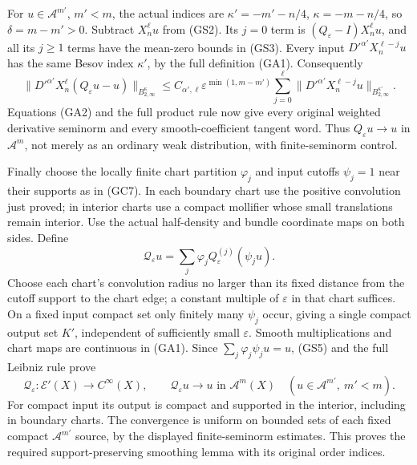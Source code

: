 \documentclass[
  11pt,
]{article}
\makeatletter
\let\ReaderOriginalAnchorStart\hyper@anchorstart
\let\ReaderOriginalAnchorEnd\hyper@anchorend
\let\ReaderPendingAliases\@empty
\def\ReaderArmAliases#1{\gdef\ReaderPendingAliases{#1}}
\def\hyper@anchorstart#1{\ReaderIfNativeAnchorTF{#1}{\ReaderPendingAliases\global\let\ReaderPendingAliases\@empty}{}\ReaderOriginalAnchorStart{#1}}
\makeatother
\begin{document}
For \(u\in\mathcal A^{m'}\), \(m'<m\), the actual indices are
\(\kappa'=-m'-n/4\), \(\kappa=-m-n/4\), so \(\delta=m-m'>0\). Subtract
\(X_n^\ell u\) from (GS2). Its \(j=0\) term is
\((Q_\varepsilon-I)X_n^\ell u\), and all its \(j\ge1\) terms have the
mean-zero bounds in (GS3). Every input \(D'^{\alpha'}X_n^{\ell-j}u\) has
the same Besov index \(\kappa'\), by the full definition (GA1).
Consequently \[
 \|D'^{\alpha'}X_n^\ell(Q_\varepsilon u-u)\|_{B^\kappa_{2,\infty}}
 \le C_{\alpha',\ell}\varepsilon^{\min(1,m-m')}
       \sum_{j=0}^\ell
       \|D'^{\alpha'}X_n^{\ell-j}u\|_{B^{\kappa'}_{2,\infty}}.
 \tag{GS5}
\] Equations (GA2) and the full product rule now give every original
weighted derivative seminorm and every smooth-coefficient tangent word.
Thus \(Q_\varepsilon u\to u\) in \(\mathcal A^m\), not merely as an
ordinary weak distribution, with finite-seminorm control.

Finally choose the locally finite chart partition \(\varphi_j\) and
input cutoffs \(\psi_j=1\) near their supports as in (GC7). In each
boundary chart use the positive convolution just proved; in interior
charts use a compact mollifier whose small translations remain interior.
Use the actual half-density and bundle coordinate maps on both sides.
Define \[
 \mathcal Q_\varepsilon u
    =\sum_j\varphi_j Q^{(j)}_\varepsilon(\psi_j u).
 \tag{GS6}
\] Choose each chart's convolution radius no larger than its fixed
distance from the cutoff support to the chart edge; a constant multiple
of \(\varepsilon\) in that chart suffices. On a fixed input compact set
only finitely many \(\psi_j\) occur, giving a single compact output set
\(K'\), independent of sufficiently small \(\varepsilon\). Smooth
multiplications and chart maps are continuous in (GA1). Since
\(\sum_j\varphi_j\psi_j u=u\), (GS5) and the full Leibniz rule prove \[
 \mathcal Q_\varepsilon:\mathcal E'(X)\to C^\infty(X),\qquad
 \mathcal Q_\varepsilon u\longrightarrow u\text{ in }\mathcal A^m(X)
 \quad(u\in\mathcal A^{m'},\ m'<m).
 \tag{GS7}
\] For compact input its output is compact and supported in the
interior, including in boundary charts. The convergence is uniform on
bounded sets of each fixed compact \(\mathcal A^{m'}\) source, by the
displayed finite-seminorm estimates. This proves the required
support-preserving smoothing lemma with its original order indices.

\ReaderArmAliases{\ReaderOriginalAnchorStart{AN03-GBD-003}\ReaderOriginalAnchorEnd\begingroup\expandafter\def\csname @currentHref\endcsname{AN03-GBD-003}\label{AN03-GBD-003}\endgroup\ReaderOriginalAnchorStart{3-dual-distributions-and-boundary-traces}\ReaderOriginalAnchorEnd\begingroup\expandafter\def\csname @currentHref\endcsname{3-dual-distributions-and-boundary-traces}\label{3-dual-distributions-and-boundary-traces}\endgroup}
\end{document}
